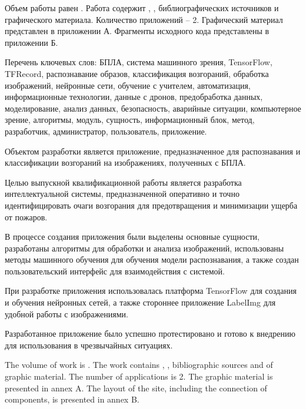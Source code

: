 
Объем работы равен . Работа содержит , ,  библиографических источников и  графического материала. Количество приложений – 2. Графический материал представлен в приложении А. Фрагменты исходного кода представлены в приложении Б.

Перечень ключевых слов: БПЛА, система машинного зрения, TensorFlow, TFRecord, распознавание образов, классификация возгораний, обработка изображений, нейронные сети, обучение с учителем, автоматизация, информационные технологии, данные с дронов, предобработка данных, моделирование, анализ данных, безопасность, аварийные ситуации, компьютерное зрение, алгоритмы, модуль, сущность, информационный блок, метод, разработчик, администратор, пользователь, приложение.

Объектом разработки является приложение, предназначенное для распознавания и классификации возгораний на изображениях, полученных с БПЛА.

Целью выпускной квалификационной работы является разработка интеллектуальной системы, предназначенной оперативно и точно идентифицировать очаги возгорания для предотвращения и минимизации ущерба от пожаров.

В процессе создания приложения были выделены основные сущности, разработаны алгоритмы для обработки и анализа изображений, использованы методы машинного обучения для обучения модели распознавания, а также создан пользовательский интерфейс для взаимодействия с системой.

При разработке приложения использовалась платформа TensorFlow для создания и обучения нейронных сетей, а также стороннее приложение LabelImg для удобной работы с изображениями.

Разработанное приложение было успешно протестировано и готово к внедрению для использования в чрезвычайных ситуациях.

  
The volume of work is . The work contains , ,  bibliographic sources and  of graphic material. The number of applications is 2. The graphic material is presented in annex A. The layout of the site, including the connection of components, is presented in annex B.

